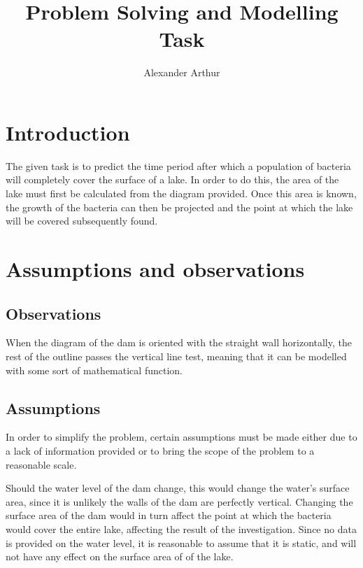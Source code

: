 \documentclass{article}
\title{Problem Solving and Modelling Task}
\author{Alexander Arthur}
\begin{document}
\maketitle
\setcounter{tocdepth}{1}
\tableofcontents



\section{Introduction}
The given task is to predict the time period after which a population of bacteria will completely cover the surface of a lake. In order to do this, the area of the lake must first be calculated from the diagram provided. Once this area is known, the growth of the bacteria can then be projected and the point at which the lake will be covered subsequently found.


\section{Assumptions and observations}

    \subsection{Observations}

    When the diagram of the dam is oriented with the straight wall horizontally, the rest of the outline passes the vertical line test, meaning that it can be modelled with some sort of mathematical function.

    
    \subsection{Assumptions}
    
    In order to simplify the problem, certain assumptions must be made either due to a lack of information provided or to bring the scope of the problem to a reasonable scale.

    Should the water level of the dam change, this would change the water's surface area, since it is unlikely the walls of the dam are perfectly vertical. Changing the surface area of the dam would in turn affect the point at which the bacteria would cover the entire lake, affecting the result of the investigation. Since no data is provided on the water level, it is reasonable to assume that it is static, and will not have any effect on the surface area of of the lake.
\end{document}
